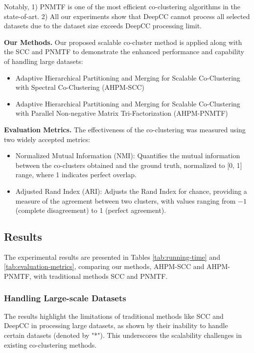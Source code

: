 \documentclass[letterpaper, 10 pt, conference]{ieeeconf}  %
\begin{document}
Notably, 1) PNMTF is one of the most efficient co-clustering algorithms in the state-of-art. 2) All our experiments show that DeepCC cannot process all selected datasets due to the dataset size exceeds DeepCC processing limit.

\textbf{Our Methods.} Our proposed scalable co-cluster method is applied along with the SCC and PNMTF to demonstrate the enhanced performance and capability of handling large datasets:
\begin{itemize}
    \item Adaptive Hierarchical Partitioning and Merging for Scalable Co-Clustering with Spectral Co-Clustering (AHPM-SCC)
    \item Adaptive Hierarchical Partitioning and Merging for Scalable Co-Clustering with Parallel Non-negative Matrix Tri-Factorization (AHPM-PNMTF)
\end{itemize}

\textbf{Evaluation Metrics.}
The effectiveness of the co-clustering was measured using two widely accepted metrics:

\begin{itemize}
    \item Normalized Mutual Information (NMI): Quantifies the mutual information between the co-clusters obtained and the ground truth, normalized to [0, 1] range, where 1 indicates perfect overlap.
    \item Adjusted Rand Index (ARI): Adjusts the Rand Index for chance, providing a measure of the agreement between two clusters, with values ranging from $-1$ (complete disagreement) to 1 (perfect agreement).
\end{itemize}

\subsection{Results}
The experimental results are presented in Tables \ref{tab:running-time} and \ref{tab:evaluation-metrics}, comparing our methods, AHPM-SCC and AHPM-PNMTF, with traditional methods SCC and PNMTF.

\subsubsection{Handling Large-scale Datasets} The results highlight the limitations of traditional methods like SCC and DeepCC in processing large datasets, as shown by their inability to handle certain datasets (denoted by "*"). This underscores the scalability challenges in existing co-clustering methods.
\end{document}

